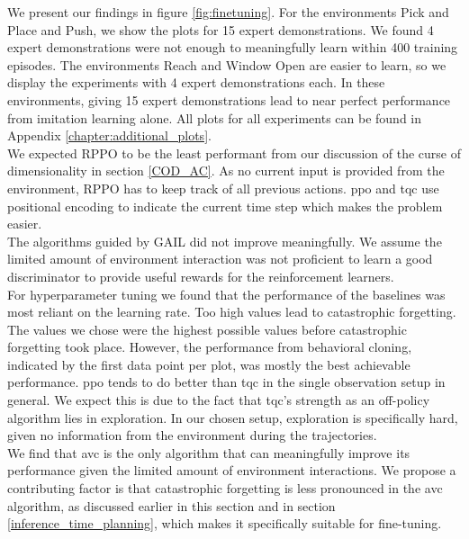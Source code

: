 We present our findings in figure \ref{fig:finetuning}. 
For the environments Pick and Place and Push, we show the plots for 15 expert demonstrations. We found 4 expert demonstrations were not 
enough to meaningfully learn within 400 training episodes. The environments Reach and Window Open are easier to learn, so we display the 
experiments with 4 expert demonstrations each. In these environments, giving 15 expert demonstrations lead to near perfect performance from imitation learning alone. 
All plots for all experiments can be found in Appendix \ref{chapter:additional_plots}.\\

We expected RPPO to be the least performant from our discussion of the curse of dimensionality in section \ref{COD_AC}. As no current input 
is provided from the environment, RPPO has to keep track of all previous actions. \ac{ppo} and \ac{tqc} use positional encoding to indicate the current 
time step which makes the problem easier.\\ 

The algorithms guided by GAIL did not improve meaningfully. We assume the limited amount of environment 
interaction was not proficient to learn a good discriminator to provide useful rewards for the reinforcement learners.\\ 

For hyperparameter tuning we found that the performance of the baselines was most 
reliant on the learning rate. Too high values lead to catastrophic forgetting. The values we chose were the highest possible values before 
catastrophic forgetting took place. However, the performance from behavioral cloning, indicated by the first data point per plot, was mostly 
the best achievable performance. \ac{ppo} tends to do better than \ac{tqc} in the single observation setup in general. We expect this is due to the 
fact that \ac{tqc}'s strength as an off-policy algorithm lies in exploration. In our chosen setup, exploration is specifically hard, given no 
information from the environment during the trajectories.\\

We find that \ac{avc} is the only algorithm that can meaningfully improve its performance given the limited amount of environment interactions. 
We propose a contributing factor is that catastrophic forgetting is less pronounced in the \ac{avc} algorithm, as discussed earlier in this section and in section \ref{inference_time_planning}, 
which makes it specifically suitable for fine-tuning.



